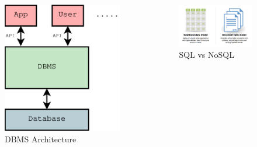 \documentclass{beamer}
\begin{document}
\begin{frame}
  \begin{columns}[c] %

    \begin{figure}
      \centering
      \includegraphics[width=0.65\linewidth]{dbms}
      \caption{DBMS Architecture}
    \end{figure}

    \begin{figure}
      \centering
      \includegraphics[width=1.25\linewidth]{sql_vs_nosql}
      \caption{SQL vs NoSQL}
    \end{figure}
    
  \end{columns}
\end{frame}
\end{document}
